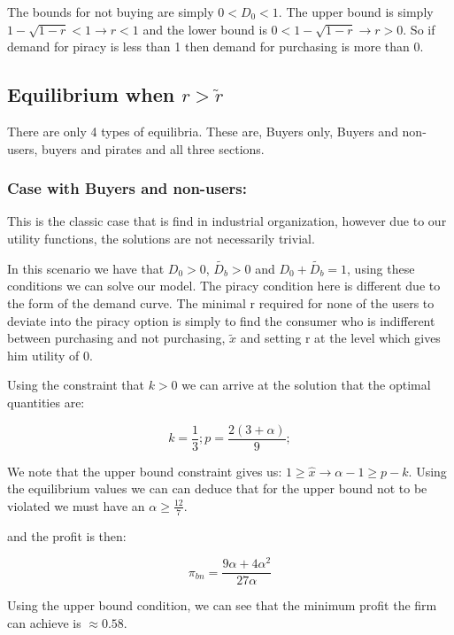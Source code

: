 \documentclass{article}
\begin{document}
The bounds for not buying are simply $0<D_0<1$. The upper bound is simply $1-\sqrt{1-r}<1 \rightarrow r<1$ and the lower bound is $0<1-\sqrt{1-r} \rightarrow r>0$. So if demand for piracy is less than 1 then demand for purchasing is more than 0. 



\subsection{ Equilibrium when $r>\tilde{r}$}

There are only 4 types of equilibria. These are, Buyers only, Buyers and non-users, buyers and pirates and all three sections. 

\subsubsection{Case with Buyers and non-users:}

This is the classic case that is find in industrial organization, however due to our utility functions, the solutions are not necessarily trivial. 

In this scenario we have that $D_0>0$, $\tilde{D_b}>0$ and $D_0+\tilde{D_b}=1$, using these conditions we can solve our model. The piracy condition here is different due to the form of the demand curve. The minimal r required for none of the users to deviate into the piracy option is simply to find the consumer who is indifferent between purchasing and not purchasing, $\tilde{x}$ and setting r at the level which gives him utility of 0. 

Using the constraint that $k>0$ we can arrive at the solution that the optimal quantities are: 

\begin{equation}
k = \frac{1}{3}; p=\frac{2(3+\alpha)}{9};
\end{equation}

We note that the upper bound constraint gives us: $1 \geq \hat{x} \rightarrow \alpha-1 \geq p-k$. Using the equilibrium values we can can deduce that for the upper bound not to be violated we must have an $\alpha \geq \frac{12}{7}$. 

and the profit is then: 

\begin{equation}
\pi_{bn} =\frac{9\alpha+4\alpha^2}{27 \alpha}
\end{equation}

Using the upper bound condition, we can see that the minimum profit the firm can achieve is $\approx 0.58$. 
\end{document}
